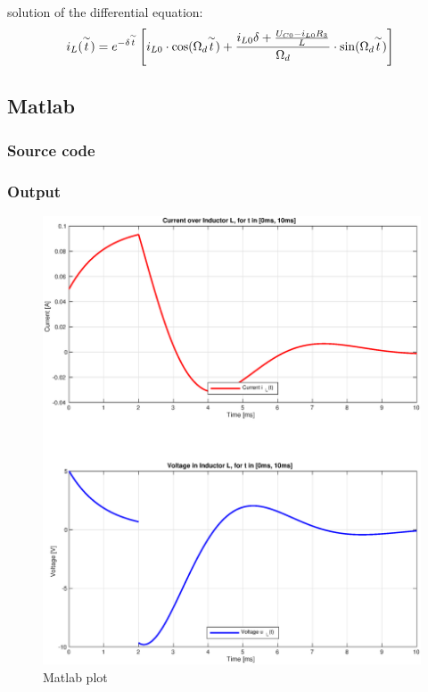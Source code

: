 \documentclass[a4paper]{article}
\begin{document}
solution of the differential equation:
\begin{equation*}
	i_L(\overset{\sim }{t}) = e^{-\delta \overset{\sim }{t}} \left[i_{L0} \cdot
	\cos(\Omega_d\overset{\sim }{t}) + \frac{i_{L0}\delta + \frac{U_{C0} -
      i_{L0}R_3}{L}}{\Omega_d} \cdot \sin(\Omega_d\overset{\sim }{t}) \right]\\
\end{equation*}
\clearpage
\subsection{Matlab}
\subsubsection{Source code}

\subsubsection{Output}
\begin{figure}[h!]\centering
  \includegraphics[scale = 0.55]{./Figures/assignment4_plot.eps}
   \caption{Matlab plot}
   \label{fig:matlab}
\end{figure}
\clearpage
\end{document}
